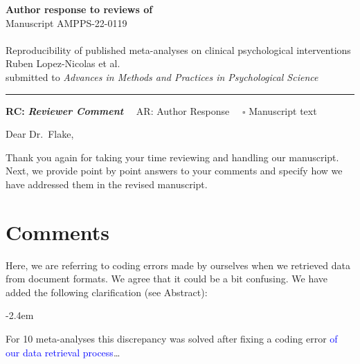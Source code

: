 \documentclass[draft]{article}
\renewenvironment{quote}{\begin{fquote}\advance\leftmargini -2.4em\begin{oldquote}}{\end{oldquote}\end{fquote}}
\newenvironment{fquote}
  {\def\FrameCommand{
	\fboxsep=0.6em %
	\fcolorbox{black}{white}}%
    \MakeFramed {\advance\hsize-2\width \FrameRestore}
    \begin{minipage}{\linewidth}
  }
  {\end{minipage}\endMakeFramed}
\begin{document}
{\Large\bf Author response to reviews of}\\[1em]
Manuscript AMPPS-22-0119\\ \\
{\Large Reproducibility of published meta-analyses on clinical psychological interventions}\\[1em]
{Ruben Lopez-Nicolas et al.}\\
{submitted to \it Advances in Methods and Practices in Psychological Science }\\
\hrule

\hfill {\bfseries RC:} \textbf{\textit{Reviewer Comment}}\(\quad\) AR: Author Response \(\quad\square\) Manuscript text

\vspace{2em}

Dear Dr.~Flake,

Thank you again for taking your time reviewing and handling our manuscript. Next, we provide point by point answers to your comments and specify how we have addressed them in the revised manuscript.

\hypertarget{comments}{%
\section{Comments}\label{comments}}


Here, we are referring to coding errors made by ourselves when we retrieved data from document formats. We agree that it could be a bit confusing. We have added the following clarification (see Abstract):

\begin{quote}
For 10 meta-analyses this discrepancy was solved after fixing a coding error \textcolor{blue}{of our data retrieval process}\ldots{}
\end{quote}

\end{document}
